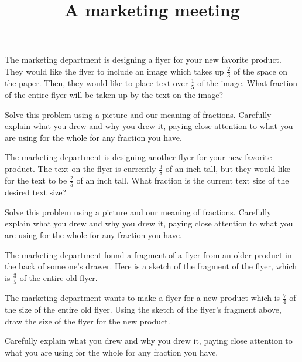 \documentclass[nooutcomes,noauthor]{ximera}
\title{A marketing meeting}
\begin{document}
\begin{abstract}
\end{abstract}

\maketitle


\begin{problem}
The marketing department is designing a flyer for your new favorite product. They would like the flyer to include an image which takes up $\frac{2}{3}$ of the space on the paper. Then, they would like to place text over $\frac{1}{5}$ of the image. What fraction of the entire flyer will be taken up by the text on the image?

Solve this problem using a picture and our meaning of fractions. Carefully explain what you drew and why you drew it, paying close attention to what you are using for the whole for any fraction you have.
\end{problem}

\begin{problem}
The marketing department is designing another flyer for your new favorite product. The text on the flyer is currently $\frac{3}{8}$ of an inch tall, but they would like for the text to be $\frac{2}{5}$ of an inch tall. What fraction is the current text size of the desired text size? 

Solve this problem using a picture and our meaning of fractions. Carefully explain what you drew and why you drew it, paying close attention to what you are using for the whole for any fraction you have.
\end{problem}


\begin{problem}
The marketing department found a fragment of a flyer from an older product in the back of someone's drawer. Here is a sketch of the fragment of the flyer, which is $\frac{3}{5}$ of the entire old flyer. 
\begin{image}
\end{image}
The marketing department wants to make a flyer for a new product which is $\frac{7}{4}$ of the size of the entire old flyer. Using the sketch of the flyer's fragment above, draw the size of the flyer for the new product.

Carefully explain what you drew and why you drew it, paying close attention to what you are using for the whole for any fraction you have.
\end{problem}
\end{document}
